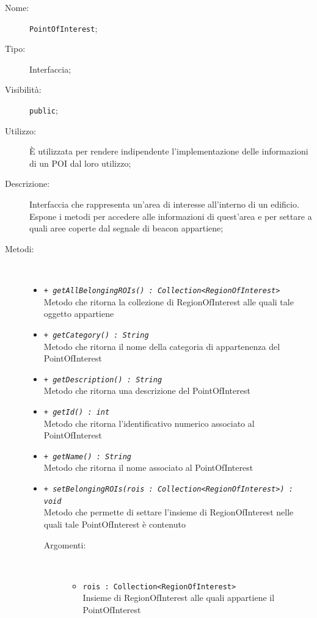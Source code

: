 \documentclass[../DefinizioneDiProdotto.tex]{subfiles}
\begin{document}
\begin{description}
	\item[Nome:] \texttt{PointOfInterest};
	\item[Tipo:] Interfaccia;
	\item[Visibilità:] \texttt{public};
	\item[Utilizzo:] È utilizzata per rendere indipendente l'implementazione delle informazioni di un POI dal loro utilizzo;
	\item[Descrizione:] Interfaccia che rappresenta un'area di interesse all'interno di un edificio. Espone i metodi per accedere alle informazioni di quest'area e per settare a quali aree coperte dal segnale di beacon appartiene;
	\item[Metodi:] \
	\begin{itemize}
		\item \texttt{+ \textit{getAllBelongingROIs() : Collection<RegionOfInterest>}}\\
		Metodo che ritorna la collezione di RegionOfInterest alle quali tale oggetto appartiene
		\item \texttt{+ \textit{getCategory() : String}}\\
		Metodo che ritorna il nome della categoria di appartenenza del PointOfInterest
		\item \texttt{+ \textit{getDescription() : String}}\\
		Metodo che ritorna una descrizione del PointOfInterest
		\item \texttt{+ \textit{getId() : int}}\\
		Metodo che ritorna l'identificativo numerico associato al PointOfInterest
		\item \texttt{+ \textit{getName() : String}}\\
		Metodo che ritorna il nome associato al PointOfInterest
		\item \texttt{+ \textit{setBelongingROIs(rois : Collection<RegionOfInterest>) : void}}\\
		Metodo che permette di settare l'insieme di RegionOfInterest nelle quali tale PointOfInterest è contenuto
		\begin{description}
			\item[Argomenti:] \
			\begin{itemize}
				\item \texttt{rois : Collection<RegionOfInterest>}\\
				Insieme di RegionOfInterest alle quali appartiene il PointOfInterest\end{itemize}
		\end{description}
	\end{itemize}
\end{description}
\end{document}
